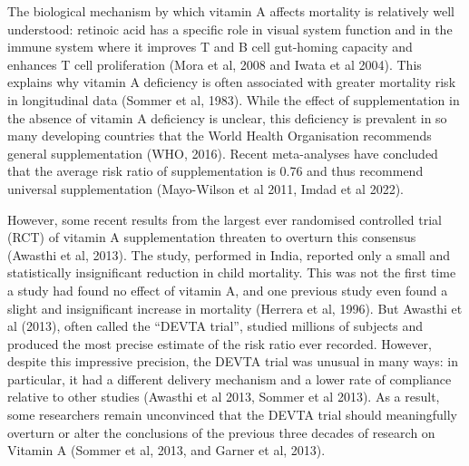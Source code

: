\documentclass[12pt]{article}
\begin{document}

The biological mechanism by which vitamin A affects mortality is relatively well understood: retinoic acid has a specific role in visual system function and in the immune system where it improves T and B cell gut-homing capacity and enhances T cell proliferation (Mora et al, 2008 and Iwata et al 2004). This explains why vitamin A deficiency is often associated with greater mortality risk in longitudinal data (Sommer et al, 1983). While the effect of supplementation in the absence of vitamin A deficiency is unclear, this deficiency is prevalent in so many developing countries that the World Health Organisation recommends general supplementation (WHO, 2016). 
Recent meta-analyses have concluded that the average risk ratio of supplementation is 0.76 and thus recommend universal supplementation (Mayo-Wilson et al 2011, Imdad et al 2022). 

However, some recent results from the largest ever randomised controlled trial (RCT) of vitamin A supplementation threaten to overturn this consensus (Awasthi et al, 2013). The study, performed in India, reported only a small and statistically insignificant reduction in child mortality. This was not the first time a study had found no effect of vitamin A, and one previous study even found a slight and insignificant increase in mortality (Herrera et al, 1996). But Awasthi et al (2013), often called the ``DEVTA trial'', studied millions of subjects and produced the most precise estimate of the risk ratio ever recorded. However, despite this impressive precision, the DEVTA trial was unusual in many ways: in particular, it had a different delivery mechanism and a lower rate of compliance relative to other studies (Awasthi et al 2013, Sommer et al 2013). As a result, some researchers remain unconvinced that the DEVTA trial should meaningfully overturn or alter the conclusions of the previous three decades of research on Vitamin A (Sommer et al, 2013, and Garner et al, 2013).
\end{document}
